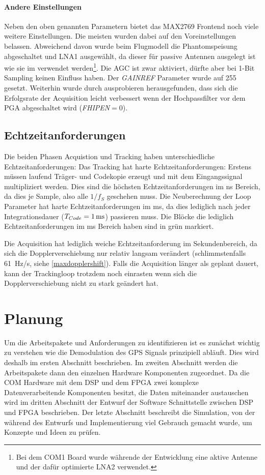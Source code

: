 \paragraph{Andere Einstellungen} Neben den oben genannten Parametern bietet das MAX2769 Frontend noch viele weitere Einstellungen. Die meisten wurden dabei auf den Voreinstellungen belassen. Abweichend davon wurde beim Flugmodell die Phantomspeisung abgeschaltet und LNA1 ausgewählt, da dieser für passive Antennen ausgelegt ist wie sie im \dscubesat verwendet werden\footnote{Bei dem COM1 Board wurde währende der Entwicklung eine aktive Antenne und der dafür optimierte LNA2 verwendet.}. Die \gls{AGC} ist zwar aktiviert, dürfte aber bei 1-Bit Sampling keinen Einfluss haben. Der \emph{GAINREF} Parameter wurde auf 255 gesetzt. Weiterhin wurde durch ausprobieren herausgefunden, dass sich die Erfolgsrate der Acquisition leicht verbessert wenn der Hochpassfilter vor dem \gls{PGA} abgeschaltet wird (\emph{FHIPEN}$=0$).

\subsection{Echtzeitanforderungen} \label{echtzeitanforderungen}
Die beiden Phasen Acquistion und Tracking haben unterschiedliche Echtzeitanforderungen: Das Tracking hat harte Echtzeitanforderungen: Erstens müssen laufend Träger- und Codekopie erzeugt und mit dem Eingangssignal multipliziert werden. Dies sind die höchsten Echtzeitanforderungen im \si{\nano\second} Bereich, da dies je Sample, also alle $1/f_S$ geschehen muss. Die Neuberechnung der Loop Parameter hat harte Echtzeitanforderungen im \si{\milli\second}, da dies lediglich nach jeder Integrationsdauer ($\gpsTcode=\SI{1}{\ms}$) passieren muss. Die Blöcke die lediglich Echtzeitanforderungen im \si{\milli\second} Bereich haben sind in  grün markiert.

Die Acquisition hat lediglich weiche Echtzeitanforderung im Sekundenbereich, da sich die Dopplerverschiebung nur relativ langsam verändert (schlimmstenfalls \SI{61}{\Hz/\second}, siehe \ref{maxdopplershift}). Falls die Acquisition länger als geplant dauert, kann der Trackingloop trotzdem noch einrasten wenn sich die Dopplerverschiebung nicht zu stark geändert hat.

\section{Planung}
Um die Arbeitspakete und Anforderungen zu identifizieren ist es zunächst wichtig zu verstehen wie die Demodulation des GPS Signals prinzipiell abläuft. Dies wird deshalb im ersten Abschnitt beschrieben. Im zweiten Abschnitt werden die Arbeitspakete dann den einzelnen Hardware Komponenten zugeordnet. Da die COM Hardware mit dem DSP und dem FPGA zwei komplexe Datenverarbeitende Komponenten besitzt, die Daten miteinander austauschen wird im dritten Abschnitt der Entwurf der Software Schnittstelle zwischen DSP und FPGA beschrieben. Der letzte Abschnitt beschreibt die Simulation, von der während des Entwurfs und Implementierung viel Gebrauch gemacht wurde, um Konzepte und Ideen zu prüfen.

